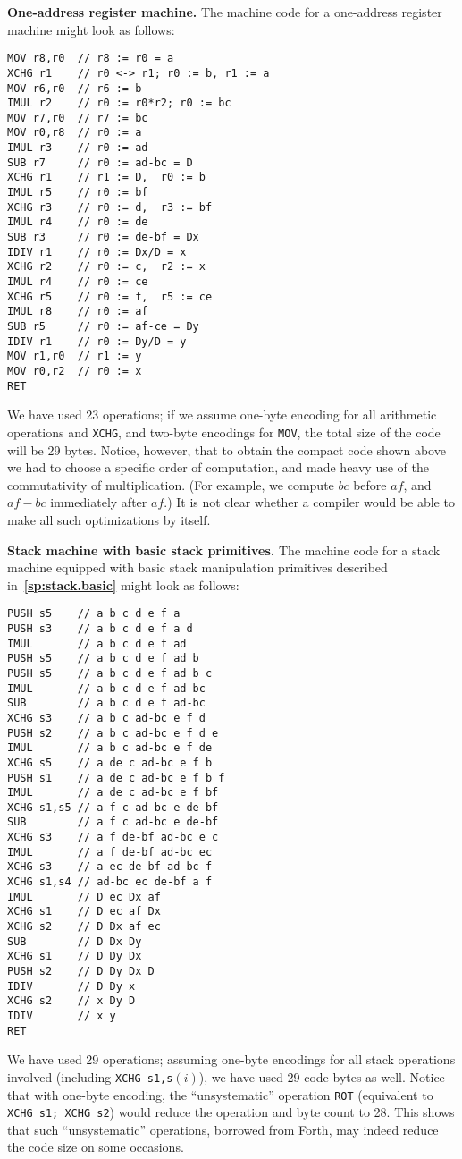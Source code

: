 \documentclass[12pt,oneside]{article}
\def\makepoint#1{\medbreak\noindent{\bf #1.\ }}
\def\nxsubpoint{\refstepcounter{subsubsection}%
  \smallbreak\makepoint{\thesubsubsection}}
\def\refpoint#1{{\rm\textbf{\ref{#1}}}}
\let\ptref=\refpoint
\def\emb#1{\textbf{#1.}}
\begin{document}
\nxsubpoint\label{sp:cmp1.1addr}\emb{One-address register machine}
The machine code for a one-address register machine might look as follows:
\begin{verbatim}
MOV r8,r0  // r8 := r0 = a
XCHG r1    // r0 <-> r1; r0 := b, r1 := a
MOV r6,r0  // r6 := b
IMUL r2    // r0 := r0*r2; r0 := bc
MOV r7,r0  // r7 := bc
MOV r0,r8  // r0 := a
IMUL r3    // r0 := ad
SUB r7     // r0 := ad-bc = D
XCHG r1    // r1 := D,  r0 := b
IMUL r5    // r0 := bf
XCHG r3    // r0 := d,  r3 := bf
IMUL r4    // r0 := de
SUB r3     // r0 := de-bf = Dx
IDIV r1    // r0 := Dx/D = x
XCHG r2    // r0 := c,  r2 := x
IMUL r4    // r0 := ce
XCHG r5    // r0 := f,  r5 := ce
IMUL r8    // r0 := af
SUB r5     // r0 := af-ce = Dy
IDIV r1    // r0 := Dy/D = y
MOV r1,r0  // r1 := y
MOV r0,r2  // r0 := x
RET
\end{verbatim}
We have used 23 operations; if we assume one-byte encoding for all arithmetic operations and \texttt{XCHG}, and two-byte encodings for \texttt{MOV}, the total size of the code will be 29 bytes. Notice, however, that to obtain the compact code shown above we had to choose a specific order of computation, and made heavy use of the commutativity of multiplication. (For example, we compute $bc$ before $af$, and $af-bc$ immediately after $af$.) It is not clear whether a compiler would be able to make all such optimizations by itself.

\nxsubpoint\label{sp:cmp1.stack.base}
\emb{Stack machine with basic stack primitives}
The machine code for a stack machine equipped with basic stack manipulation primitives described in~\ptref{sp:stack.basic} might look as follows:
\begin{verbatim}
PUSH s5    // a b c d e f a
PUSH s3    // a b c d e f a d
IMUL       // a b c d e f ad
PUSH s5    // a b c d e f ad b
PUSH s5    // a b c d e f ad b c
IMUL       // a b c d e f ad bc
SUB        // a b c d e f ad-bc
XCHG s3    // a b c ad-bc e f d
PUSH s2    // a b c ad-bc e f d e
IMUL       // a b c ad-bc e f de
XCHG s5    // a de c ad-bc e f b
PUSH s1    // a de c ad-bc e f b f
IMUL       // a de c ad-bc e f bf
XCHG s1,s5 // a f c ad-bc e de bf
SUB        // a f c ad-bc e de-bf
XCHG s3    // a f de-bf ad-bc e c
IMUL       // a f de-bf ad-bc ec
XCHG s3    // a ec de-bf ad-bc f
XCHG s1,s4 // ad-bc ec de-bf a f
IMUL       // D ec Dx af
XCHG s1    // D ec af Dx
XCHG s2    // D Dx af ec
SUB        // D Dx Dy
XCHG s1    // D Dy Dx
PUSH s2    // D Dy Dx D
IDIV       // D Dy x
XCHG s2    // x Dy D
IDIV       // x y
RET
\end{verbatim}
We have used 29 operations; assuming one-byte encodings for all stack operations involved (including \texttt{XCHG s1,s$(i)$}), we have used 29 code bytes as well. Notice that with one-byte encoding, the ``unsystematic'' operation \texttt{ROT} (equivalent to \texttt{XCHG s1; XCHG s2}) would reduce the operation and byte count to 28. This shows that such ``unsystematic'' operations, borrowed from Forth, may indeed reduce the code size on some occasions.
\end{document}
